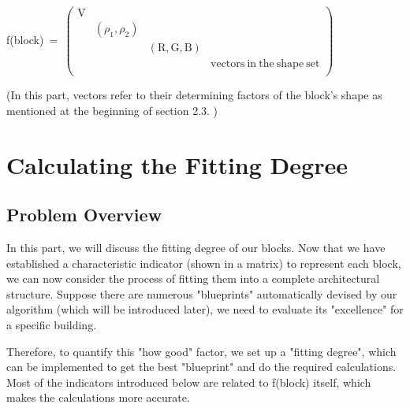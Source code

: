 \documentclass[12pt]{article}
\theoremstyle{definition}
\theoremstyle{remark}
\numberwithin{equation}{section}
\begin{document}
	  \begin{center}
	  f(block)\ =\ $\left(\begin{array}{cccc}\mathrm{V}&\ &\ &\ \\\ &(\rho_{1},\rho_{2})&\ &\ \\\ &\ &(\mathrm{R},\mathrm{G},\mathrm{B})&\ \\\ &\ &\ &\mathrm{vectors\ in\ the\ shape\ set}\\\end{array}\right)$
	  \end{center}

	(In this part, vectors refer to their determining factors of the block's shape as mentioned at the beginning of section 2.3. )
	
	\section{Calculating the Fitting Degree}
	\subsection{Problem Overview}
		In this part, we will discuss the fitting degree of our blocks. Now that we have established a characteristic indicator (shown in a matrix) to represent each block, we can now consider the process of fitting them into a complete architectural structure. Suppose there are numerous "blueprints" automatically devised by our algorithm (which will be introduced later), we need to evaluate its "excellence" for a specific building. 
		
		Therefore, to quantify this "how good" factor, we set up a "fitting degree", which can be implemented to get the best "blueprint" and do the required calculations. Most of the indicators introduced below are related to f(block) itself, which makes the calculations more accurate.
\end{document}
